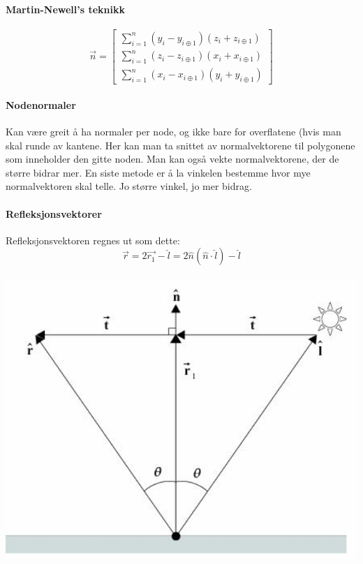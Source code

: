\paragraph{Martin-Newell's teknikk}
\begin{equation}
    \vec{n} = \begin{bmatrix}
        \sum_{i=1}^n(y_i - y_{i\oplus 1})(z_i + z_{i\oplus 1}) \\
        \sum_{i=1}^n(z_i - z_{i\oplus 1})(x_i + x_{i\oplus 1}) \\
        \sum_{i=1}^n(x_i - x_{i\oplus 1})(y_i + y_{i\oplus 1})
    \end{bmatrix}
\end{equation}

\paragraph{Nodenormaler}
Kan være greit å ha normaler per node, og ikke bare for overflatene (hvis man skal runde av kantene. Her kan man ta snittet av normalvektorene til polygonene som inneholder den gitte noden. Man kan også vekte normalvektorene, der de større bidrar mer. En siste metode er å la vinkelen bestemme hvor mye normalvektoren skal telle. Jo større vinkel, jo mer bidrag.


\paragraph{Refleksjonsvektorer}

Refleksjonsvektoren regnes ut som dette:
\begin{equation}
    \vec{r} = 2 \vec{r_1} - \hat l = 2 \hat n(\hat n \cdot \hat l) - \hat l
\end{equation}
\\ \includegraphics[width=\textwidth]{Bilder/reflection.png}

